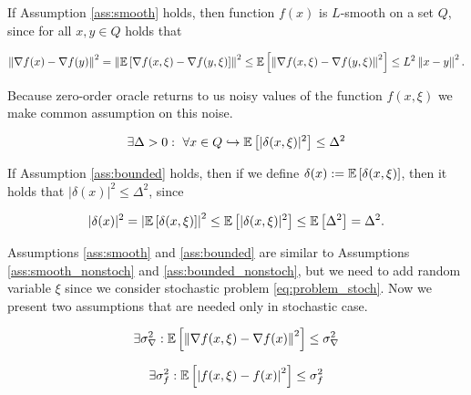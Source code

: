         If Assumption \ref{ass:smooth} holds, then function $f(x)$ is $L$-smooth on a set $Q$, since for all $x, y \in Q$ holds that
    
        \begin{equation*}
            \left\| \nabla f(x) - \nabla f(y) \right\|^2 = \left\| \mathbb{E}\left[ \nabla f(x, \xi) - \nabla f(y, \xi) \right] \right\|^2 \leq \mathbb{E}\left[ \left\| \nabla f(x, \xi) - \nabla f(y, \xi) \right\|^2 \right] \leq L^2 \left\| x - y \right\|^2.
        \end{equation*}
    
        Because zero-order oracle returns to us noisy values of the function $f(x, \xi)$ we make common assumption on this noise.
    
        \begin{assumption}\label{ass:bounded}
            \begin{equation*}
                \exists \Delta > 0 : ~\forall x \in Q \hookrightarrow \mathbb{E}\left[ |\delta(x, \xi)|^2 \right] \leq \Delta^2
            \end{equation*}
        \end{assumption}
    
        If Assumption \ref{ass:bounded} holds, then if we define $\delta(x) := \mathbb{E}\left[ \delta(x, \xi) \right]$, then it holds that $|\delta(x)|^2 \leq \Delta^2$, since
    
        \begin{equation*}
            |\delta(x)|^2 = \left| \mathbb{E}\left[ \delta(x, \xi) \right] \right|^2 \leq \mathbb{E}\left[ |\delta(x, \xi)|^2 \right] \leq \mathbb{E}\left[ \Delta^2 \right] = \Delta^2.
        \end{equation*}

        Assumptions \ref{ass:smooth} and \ref{ass:bounded} are similar to Assumptions \ref{ass:smooth_nonstoch} and \ref{ass:bounded_nonstoch}, but we need to add random variable $\xi$ since we consider stochastic problem \eqref{eq:problem_stoch}. Now we present two assumptions that are needed only in stochastic case.
    
        \begin{assumption} \label{ass:sigma_nabla}
            \begin{equation*}
                \exists \sigma^2_{\nabla} : \mathbb{E}\left[ \left\| \nabla f(x, \xi) - \nabla f(x) \right\|^2 \right] \leq \sigma^2_{\nabla}
            \end{equation*}
        \end{assumption}
    
        \begin{assumption} \label{ass:sigma_f}
            \begin{equation*}
                \exists \sigma^2_{f} : \mathbb{E}\left[ \left|f(x, \xi) - f(x) \right|^2 \right] \leq \sigma^2_{f}
            \end{equation*}
        \end{assumption}
    
